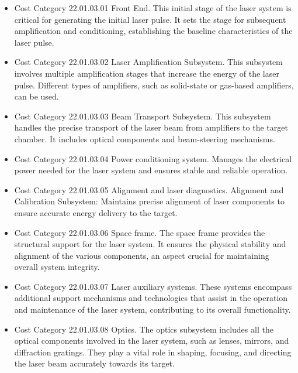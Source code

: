    \begin{itemize} 
   \item Cost Category 22.01.03.01 Front End. This initial stage of the laser system is critical for generating the initial laser pulse. It sets the stage for subsequent amplification and conditioning, establishing the baseline characteristics of the laser pulse.
   \item Cost Category 22.01.03.02 Laser Amplification Subsystem. This subsystem involves multiple amplification stages that increase the energy of the laser pulse. Different types of amplifiers, such as solid-state or gas-based amplifiers, can be used.   
   \item Cost Category 22.01.03.03 Beam Transport Subsystem. This subsystem handles the precise transport of the laser beam from amplifiers to the target chamber. It includes optical components and beam-steering mechanisms.   
   \item Cost Category 22.01.03.04 Power conditioning system. Manages the electrical power needed for the laser system and ensures stable and reliable operation.
   \item Cost Category 22.01.03.05 Alignment and laser diagnostics.  Alignment and Calibration Subsystem: Maintains precise alignment of laser components to ensure accurate energy delivery to the target.
   \item Cost Category 22.01.03.06 Space frame. The space frame provides the structural support for the laser system. It ensures the physical stability and alignment of the various components, an aspect crucial for maintaining overall system integrity.
   \item Cost Category 22.01.03.07 Laser auxiliary systems. These systems encompass additional support mechanisms and technologies that assist in the operation and maintenance of the laser system, contributing to its overall functionality.
   \item Cost Category 22.01.03.08 Optics. The optics subsystem includes all the optical components involved in the laser system, such as lenses, mirrors, and diffraction gratings. They play a vital role in shaping, focusing, and directing the laser beam accurately towards its target.

   \end{itemize}   
   

